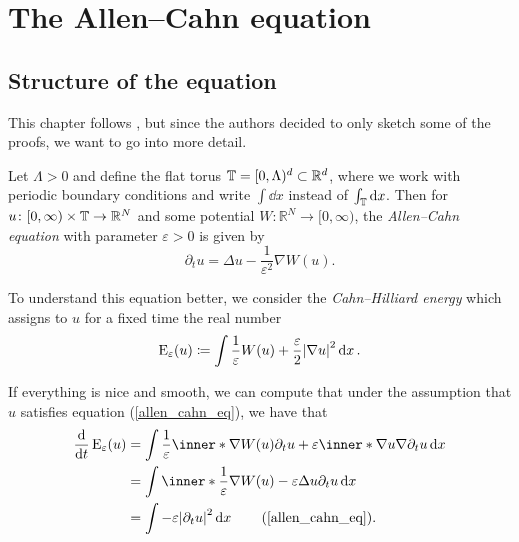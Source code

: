 \chapter{The Allen--Cahn equation}

\section{Structure of the equation}

This chapter follows \cite{convergence_of_allen_cahn_equation_to_multiphase_mean_curvature_flow}, but since the authors decided to only sketch some of the proofs, we want to go into more detail.

Let $ \Lambda > 0 $ and define the flat torus 
$ \operatorname{\mathbb{T}} = [0, \Lambda )^{ d } \subset \mathbb{ R }^{ d } $, 
where we work with periodic boundary conditions and write $ \int \dd{x} $ instead of $ \int_{ \operatorname{\mathbb{T}} } \dd{x} $.
Then for 
$ u \colon [ 0 , \infty ) \times \operatorname{\mathbb{T}} \to \mathbb{ R }^{ N } $ 
and some potential 
$ W \colon \mathbb{ R }^{ N } \to [0, \infty ) $,
the \emph{Allen--Cahn equation} with parameter $ \varepsilon > 0 $ is given by
\begin{equation}
	\label{allen_cahn_eq}
	\partial_{ t } u 
	=
	\Delta u - \frac{1 }{ \varepsilon^{ 2 } } \nabla W ( u ).
\end{equation}

To understand this equation better, we consider the \emph{Cahn--Hilliard energy} which assigns to $ u $ for a fixed time the real number
\begin{equation}
	\label{cahn_hilliard_energy}
	\operatorname{E}_{ \varepsilon } 
		(u)
	\coloneqq
	\int
		\frac{ 1 }{ \varepsilon }
		W ( u )
		+
		\frac{ \varepsilon }{ 2 }
		\abs{ \nabla u }^{ 2 }
	\dd{x}.
\end{equation}

If everything is nice and smooth, we can compute that under the assumption that $ u $ satisfies 
equation (\ref{allen_cahn_eq}), we have that
\begin{align*}
	\dv{t} \energy_{ \varepsilon } ( u )
	&=
	\int
		\frac{ 1 }{ \varepsilon }
		\inner*{\nabla W ( u )}{ \partial_{ t } u}
		+
		\varepsilon
		\inner*{\nabla u}{ \nabla \partial_{ t } u}
	\dd{x}
	\\
	&=
	\int
		\inner*{ \frac{ 1 }{\varepsilon } \nabla W ( u ) - \varepsilon \Delta u  }{ \partial_{ t } u }
	\dd{x}
	\\
	&=
	\int - \varepsilon \abs{ \partial_{ t } u }^{ 2 } \dd{ x }
	\tag{\ref{allen_cahn_eq}}.
\end{align*}

